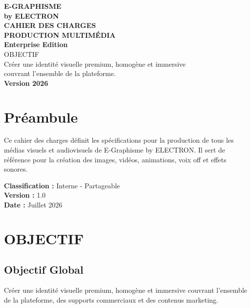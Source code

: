 \documentclass[12pt,a4paper,oneside]{book}
\begin{document}
\begin{titlepage}
\thispagestyle{empty}
\begin{center}
\vspace*{2cm}
{\Huge\bfseries\color{bleuIA}E-GRAPHISME}\\[0.3cm]
{\LARGE\bfseries\color{violetIA}by ELECTRON}\\[2cm]
\vspace{2cm}
{\huge\bfseries\color{noir}CAHIER DES CHARGES}\\[0.3cm]
{\huge\bfseries\color{noir}PRODUCTION MULTIMÉDIA}\\[1cm]
{\Large\bfseries\color{cyan}Enterprise Edition}\\[3cm]
\vspace{2cm}
{\Large\color{anthracite}OBJECTIF}\\[0.5cm]
{\Large\color{noir}Créer une identité visuelle premium, homogène et immersive}\\[0.3cm]
{\Large\color{noir}couvrant l'ensemble de la plateforme.}\\[3cm]
{\Large\bfseries\color{or}Version 2026}\\[2cm]
\vfill
\end{center}
\end{titlepage}

\frontmatter

\chapter*{Préambule}
Ce cahier des charges définit les spécifications pour la production de tous les médias visuels et audiovisuels de E-Graphisme by ELECTRON. Il sert de référence pour la création des images, vidéos, animations, voix off et effets sonores.

\bigskip
\textbf{Classification :} Interne - Partageable\\
\textbf{Version :} 1.0\\
\textbf{Date :} Juillet 2026

\tableofcontents

\mainmatter

\chapter{OBJECTIF}

\section{Objectif Global}
Créer une identité visuelle premium, homogène et immersive couvrant l'ensemble de la plateforme, des supports commerciaux et des contenus marketing.
\end{document}
